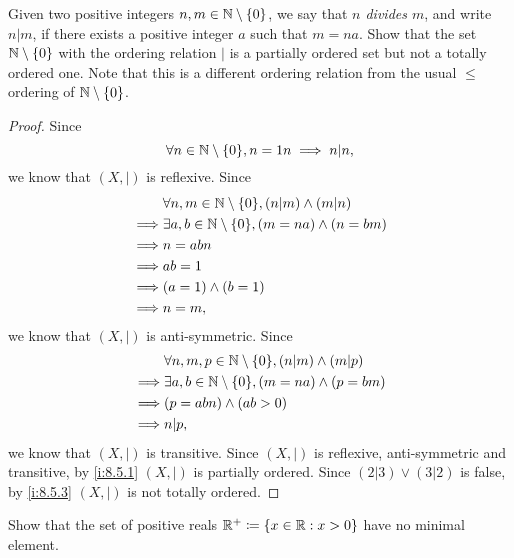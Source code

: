 \begin{ex}\label{i:ex:8.5.3}
  Given two positive integers \(n, m \in \mathbb{N} \setminus \left\lbrace0\right\rbrace\), we say that \emph{\(n\) divides \(m\)}, and write \(n | m\), if there exists a positive integer \(a\) such that \(m = na\).
  Show that the set \(\mathbb{N} \setminus \left\lbrace0\right\rbrace\) with the ordering relation \(|\) is a partially ordered set but not a totally ordered one.
  Note that this is a different ordering relation from the usual \(\leq\) ordering of \(\mathbb{N} \setminus \left\lbrace0\right\rbrace\).
\end{ex}

\begin{proof}
  Since
  \[
    \forall n \in \N \setminus \set{0}, n = 1n \implies n | n,
  \]
  we know that \((X, |)\) is reflexive.
  Since
  \begin{align*}
             & \forall n, m \in \N \setminus \set{0}, (n | m) \land (m | n)   \\
    \implies & \exists a, b \in \N \setminus \set{0}, (m = na) \land (n = bm) \\
    \implies & n = abn                                                        \\
    \implies & ab = 1                                                         \\
    \implies & (a = 1) \land (b = 1)                                          \\
    \implies & n = m,
  \end{align*}
  we know that \((X, |)\) is anti-symmetric.
  Since
  \begin{align*}
             & \forall n, m, p \in \N \setminus \set{0}, (n | m) \land (m | p) \\
    \implies & \exists a, b \in \N \setminus \set{0}, (m = na) \land (p = bm)  \\
    \implies & (p = abn) \land (ab > 0)                                        \\
    \implies & n | p,
  \end{align*}
  we know that \((X, |)\) is transitive.
  Since \((X, |)\) is reflexive, anti-symmetric and transitive, by \cref{i:8.5.1} \((X, |)\) is partially ordered.
  Since \((2 | 3) \lor (3 | 2)\) is false, by \cref{i:8.5.3} \((X, |)\) is not totally ordered.
\end{proof}

\begin{ex}\label{i:ex:8.5.4}
  Show that the set of positive reals \(\mathbb{R}^+ \coloneqq \left\lbrace x \in \mathbb{R} : x > 0\right\rbrace\) have no minimal element.
\end{ex}

